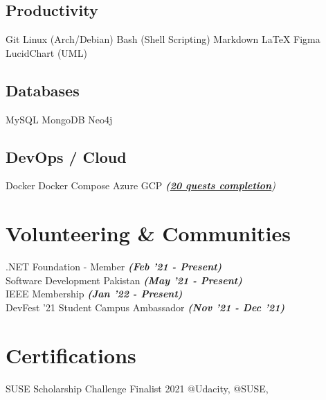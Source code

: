 \documentclass[]{openfont}
\begin{document}
\begin{minipage}[t]{0.33\textwidth}
\subsection{Productivity}
Git \textbullet{} Linux (Arch/Debian) \textbullet{} Bash (Shell Scripting) \textbullet{} Markdown \textbullet{} LaTeX \textbullet{} Figma  \textbullet{} LucidChart (UML)
\sectionsep

\subsection{Databases}
MySQL \textbullet{} MongoDB \textbullet{} Neo4j
\sectionsep

\subsection{DevOps / Cloud}
Docker \textbullet{} Docker Compose \textbullet{} Azure \textbullet{} GCP {\footnotesize\textit{\textbf{(\href{https://www.qwiklabs.com/public_profiles/d0984371-b6fe-43de-ae48-a4cbad94d26f}{20 quests completion}})}}
\sectionsep


\section{Volunteering \& Communities}
\textbullet{} .NET Foundation - Member {\footnotesize{\textit{\textbf{(Feb '21 - Present)}}}} \\
\textbullet{} Software Development Pakistan {\footnotesize{\textit{\textbf{(May '21 - Present)}}}} \\
\textbullet{} IEEE Membership {\footnotesize{\textit{\textbf{(Jan '22 - Present)}}}} \\
\textbullet{} DevFest '21 Student Campus Ambassador {\footnotesize{\textit{\textbf{(Nov '21 - Dec '21)}}}}
\sectionsep


\section{Certifications}

\textbullet{} SUSE Scholarship Challenge Finalist 2021 @Udacity, @SUSE,  


\end{minipage}
\end{document}
